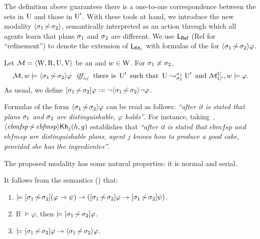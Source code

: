 \medskip

The definition above guarantees there is a one-to-one correspondence between the sets in $\operatorname{U}$ and those in $\operatorname{U}'$. 
With these tools at hand, we introduce the new modality $\langle \sigma_1{\,\not\sim\,}\sigma_2 \rangle$, semantically interpreted
as an action through which all agents learn that plans $\sigma_1$ and
$\sigma_2$ are  different.
We use $\mathsf{L_{Ref}}$ ({\small\textsf{Ref}} for ``refinement'') to denote the extension of $\mathsf{L}_{{\sf Kh}_i}$ with formulas of the for $\langle \sigma_1{\,\not\sim\,}\sigma_2 \rangle\varphi$.

\medskip

\begin{definition}\label{def:ref-sem}
Let $\mathcal{M}=\langle \operatorname{W},\operatorname{R},\operatorname{U},\operatorname{V} \rangle$ be an \ults and $w \in \operatorname{W}$.
For $\sigma_1\neq\sigma_2$,
\[
\begin{array}{l@{\ \ }c@{\ \ }l}
\modults,w\models \refdiam{\plan_1}{\plan_2}\varphi & \iffdef & \text{there is } \Unc' \text{ such that } \splitstr{\Unc}{\Unc'}{\plan_1}{\plan_2} \text{ and }  \modults^{\Unc}_{\Unc'},w \models \varphi.
\end{array}
\]
As usual, we define $[{\sigma_1{\,\not\sim\,}\sigma_2}]\varphi := \lnot \langle \sigma_1{\,\not\sim\,}\sigma_2 \rangle\lnot\varphi$.
\end{definition}

\medskip

Formulas of the form $\langle \sigma_1{\,\not\sim\,}\sigma_2 \rangle\varphi$ can be read as follows: \emph{``after it is stated that plans $\sigma_1$ and $\sigma_2$ are distinguishable, $\varphi$ holds''}. For instance, taking~, $\langle \mathit{ebmfsp}{\,\not\sim\,}\mathit{ebfmsp} \rangle{\sf Kh}_j(h,g)$ establishes that \emph{``after it is stated that $\mathit{ebmfsp}$ and $\mathit{ebfmsp}$ are distinguishable plans, agent $j$ knows how to produce a good cake, provided she has the ingredientes''}. 

The proposed modality has some natural properties: it is normal and serial.

\medskip

\begin{proposition}\label{prop:ref-normal-serial}
It follows from the semantics () that:
\begin{enumerate}
\item\label{itm:distref} $\models [{\sigma_1{\,\not\sim\,}\sigma_2}](\varphi \rightarrow \psi) \rightarrow ([{\sigma_1{\,\not\sim\,}\sigma_2}]\varphi \rightarrow
[{\sigma_1{\,\not\sim\,}\sigma_2}]\psi)$.
\item\label{itm:necessitationref} If $\models \varphi$, then $\models [{\sigma_1{\,\not\sim\,}\sigma_2}]\varphi$.
\item\label{itm:serialityref}  $\models [{\sigma_1{\,\not\sim\,}\sigma_2}]\varphi \rightarrow \langle \sigma_1{\,\not\sim\,}\sigma_2 \rangle\varphi$.
\end{enumerate}
\end{proposition}

